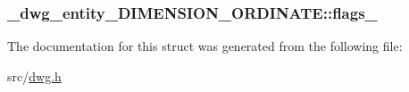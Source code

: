 \hypertarget{struct__dwg__entity__DIMENSION__ORDINATE_ae784368fb8f40973c8fd0e6a713c4943}{
\subsubsection[{flags\-\_\-2}]{ {\bf \-\_\-dwg\-\_\-entity\-\_\-\-D\-I\-M\-E\-N\-S\-I\-O\-N\-\_\-\-O\-R\-D\-I\-N\-A\-T\-E\-::flags\-\_}}}\label{struct__dwg__entity__DIMENSION__ORDINATE_ae784368fb8f40973c8fd0e6a713c4943}


\-The documentation for this struct was generated from the following file\-:\begin{DoxyCompactItemize}
\item 
src/\hyperlink{dwg_8h}{dwg.\-h}\end{DoxyCompactItemize}
